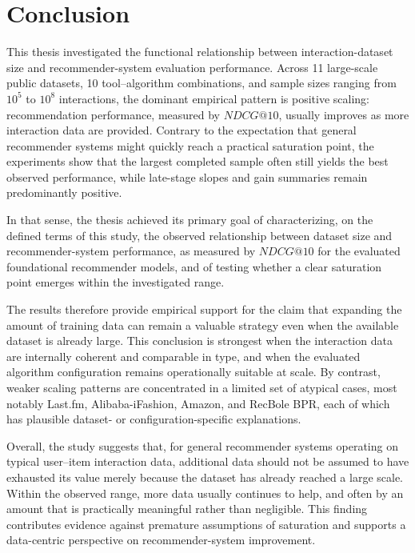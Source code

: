 \documentclass[12pt,a4paper]{article}
\begin{document}
\section{Conclusion}
This thesis investigated the functional relationship between interaction-dataset size and recommender-system evaluation performance. Across 11 large-scale public datasets, 10 tool--algorithm combinations, and sample sizes ranging from $10^5$ to $10^8$ interactions, the dominant empirical pattern is positive scaling: recommendation performance, measured by $NDCG@10$, usually improves as more interaction data are provided. Contrary to the expectation that general recommender systems might quickly reach a practical saturation point, the experiments show that the largest completed sample often still yields the best observed performance, while late-stage slopes and gain summaries remain predominantly positive.

In that sense, the thesis achieved its primary goal of characterizing, on the defined terms of this study, the observed relationship between dataset size and recommender-system performance, as measured by $NDCG@10$ for the evaluated foundational recommender models, and of testing whether a clear saturation point emerges within the investigated range.

The results therefore provide empirical support for the claim that expanding the amount of training data can remain a valuable strategy even when the available dataset is already large. This conclusion is strongest when the interaction data are internally coherent and comparable in type, and when the evaluated algorithm configuration remains operationally suitable at scale. By contrast, weaker scaling patterns are concentrated in a limited set of atypical cases, most notably Last.fm, Alibaba-iFashion, Amazon, and RecBole BPR, each of which has plausible dataset- or configuration-specific explanations.

Overall, the study suggests that, for general recommender systems operating on typical user--item interaction data, additional data should not be assumed to have exhausted its value merely because the dataset has already reached a large scale. Within the observed range, more data usually continues to help, and often by an amount that is practically meaningful rather than negligible. This finding contributes evidence against premature assumptions of saturation and supports a data-centric perspective on recommender-system improvement.
\end{document}
